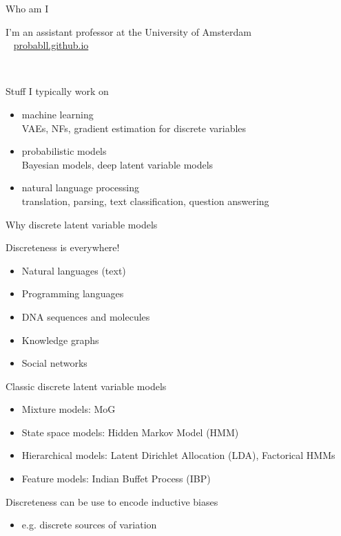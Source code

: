 \begin{frame}{Who am I}

	I'm an assistant professor at the University of Amsterdam \\
	~ \url{probabll.github.io}
	
	~
	
	Stuff I typically work on
	\begin{itemize}
		\item machine learning\\
		VAEs, NFs, gradient estimation for discrete variables
		\item probabilistic models\\
		Bayesian models, deep latent variable models
		\item natural language processing\\
		translation, parsing, text classification, question answering
	\end{itemize}

\end{frame}

\begin{frame}{Why discrete latent variable models}

	Discreteness is everywhere!
	\begin{itemize}
		\item Natural languages (text)
		\item Programming languages
		\item DNA sequences and molecules
		\item Knowledge graphs
		\item Social networks
	\end{itemize}
	
\end{frame}

\begin{frame}{Classic discrete latent variable models}
	
	\begin{itemize}
		\item Mixture models: MoG \\
		\item State space models: Hidden Markov Model (HMM) 
		\item Hierarchical models: Latent Dirichlet Allocation (LDA), Factorical HMMs
		\item Feature models: Indian Buffet Process (IBP)
	\end{itemize}
	
	\pause
	
	Discreteness can be use to encode inductive biases 
	\begin{itemize}
		\item e.g. discrete sources of variation\\
	\end{itemize}
\end{frame}


